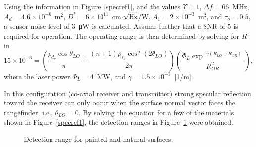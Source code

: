 

Using the information in Figure~\ref{specref1},  and the values $\Upsilon = 1$, 
$\Delta f=66$~MHz, $A_d=4.6\times10^{-6}$~m$^2$,
$D^\ast=6\times10^{11}$~cm$\cdot$$\sqrt{\rm Hz}$/W, $A_1=2\times10^{-3}$~m$^2$,
and $\tau_o=0.5$, a sensor noise level of 3~\si{\micro\watt}{} is calculated.
Assume further that a SNR of 5 is required for
operation. The operating range is then determined by solving for $R$ in
\begin{equation}
15\times 10^{-6} = \left(
\frac{\rho_{d_\theta}\cos \theta_{LO}}{\pi}+
\frac{(n+1)\rho_{s_\theta}\cos^n (2\theta_{LO})}{2\pi}
\right)
\left(\frac{
\Phi_L \exp^{-\gamma (R_{LO}+R_{OR})}}{ R^2_{OR} }
\right),
\label{lrfi5}
\end{equation}
where the laser power $\Phi_L=4$~MW, and $\gamma=1.5\times10^{-3}$~[1/m].

In this configuration (co-axial receiver and transmitter) strong specular reflection toward the receiver can only occur when the surface normal vector faces the rangefinder, i.e., $\theta_{LO}=0$. By solving the equation for a few of the materials shown in Figure~\ref{specref1}, the detection ranges in Figure~\ref{specref2} were obtained.

\begin{figure}[h]
    \centering
    \caption{\label{specref2}Detection range for painted and natural surfaces.}
    \end{figure}

